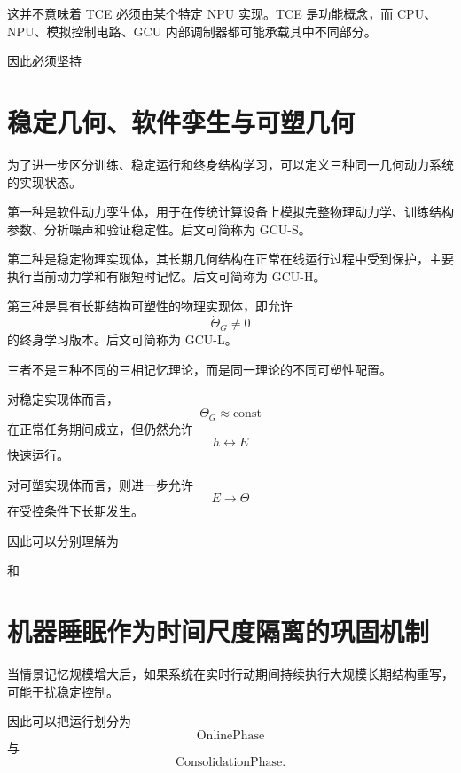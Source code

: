 这并不意味着 TCE 必须由某个特定 NPU 实现。TCE 是功能概念，而 CPU、NPU、模拟控制电路、GCU 内部调制器都可能承载其中不同部分。

因此必须坚持
\begin{statementbox}
\centering
{}
\end{statementbox}

\section{稳定几何、软件孪生与可塑几何}

为了进一步区分训练、稳定运行和终身结构学习，可以定义三种同一几何动力系统的实现状态。

第一种是软件动力孪生体，用于在传统计算设备上模拟完整物理动力学、训练结构参数、分析噪声和验证稳定性。后文可简称为 GCU-S。

第二种是稳定物理实现体，其长期几何结构在正常在线运行过程中受到保护，主要执行当前动力学和有限短时记忆。后文可简称为 GCU-H。

第三种是具有长期结构可塑性的物理实现体，即允许
\[
\dot\Theta_G\neq 0
\]
的终身学习版本。后文可简称为 GCU-L。

三者不是三种不同的三相记忆理论，而是同一理论的不同可塑性配置。

对稳定实现体而言，
\[
\Theta_G\approx\mathrm{const}
\]
在正常任务期间成立，但仍然允许
\[
h
\leftrightarrow
E
\]
快速运行。

对可塑实现体而言，则进一步允许
\[
E\rightarrow\Theta
\]
在受控条件下长期发生。

因此可以分别理解为
\begin{statementbox}
\centering
{}
\end{statementbox}
和
\begin{statementbox}
\centering
{}
\end{statementbox}

\section{机器睡眠作为时间尺度隔离的巩固机制}

当情景记忆规模增大后，如果系统在实时行动期间持续执行大规模长期结构重写，可能干扰稳定控制。

因此可以把运行划分为
\[
\mathrm{OnlinePhase}
\]
与
\[
\mathrm{ConsolidationPhase}.
\]


